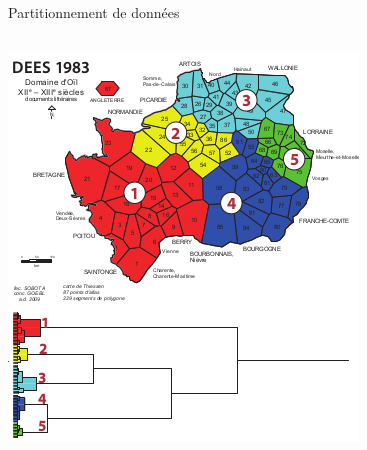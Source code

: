 \documentclass[ignorenonframetext]{beamer}
\begin{document}
\begin{frame}{Partitionnement de données}
		\begin{columns}
		\begin{column}{0.5\textwidth}
			\includegraphics[width=\textwidth]{img/Goebl_2011_Medioevo_romanzo.png}
			

\end{column}
\end{columns}
\end{frame}
\end{document}
